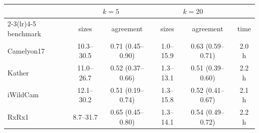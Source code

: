 \begin{tabular}{@{}lccccc@{}}
\toprule
& \multicolumn{2}{c}{$k=5$} & \multicolumn{2}{c}{$k=20$} & \\
\cmidrule(lr){2-3}\cmidrule(lr){4-5}
benchmark & sizes & agreement & sizes & agreement & time \\
\midrule
Camelyon17 & 10.3--30.5 & 0.71 (0.45--0.90) & 1.0--15.9 & 0.63 (0.59--0.71) & 2.0 h \\
Kather & 11.0--26.7 & 0.52 (0.37--0.66) & 1.3--13.1 & 0.51 (0.39--0.60) & 2.2 h \\
iWildCam & 12.1--30.2 & 0.51 (0.19--0.74) & 1.3--15.8 & 0.52 (0.41--0.67) & 2.1 h \\
RxRx1 & 8.7--31.7 & 0.65 (0.45--0.80) & 1.3--14.1 & 0.54 (0.49--0.72) & 2.2 h \\
\bottomrule
\end{tabular}
